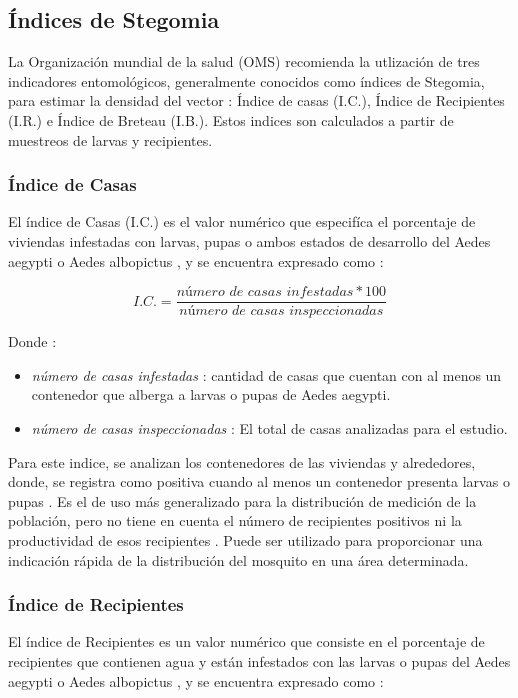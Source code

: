 
\subsection{Índices de Stegomia}
\label{sec:densidad-vectorial-indices-stegomia}
La Organización mundial de la salud (OMS) recomienda la utlización de tres indicadores
entomológicos, generalmente conocidos como índices de Stegomia, para estimar la densidad del
vector : Índice de casas (I.C.), Índice de Recipientes (I.R.) e Índice de Breteau (I.B.). Estos
indices son calculados a partir de muestreos de larvas y recipientes.

\subsubsection{Índice de Casas}
El índice de Casas (I.C.) es el valor numérico que especifíca el porcentaje de viviendas
infestadas con larvas, pupas o ambos estados de desarrollo del Aedes aegypti o Aedes albopictus
\cite{ibanez1995vectores, world2009dengue}, y se encuentra expresado como :

\begin{equation}
I.C. = \frac{\textit{número de casas infestadas} * 100}{\textit{número de casas inspeccionadas}}
\end{equation}

Donde :
\begin{itemize}
\item \textit{número de casas infestadas} : cantidad de casas que cuentan con al menos un contenedor que alberga a larvas o pupas de Aedes aegypti.
\item \textit{número de casas inspeccionadas} : El total de casas analizadas para el estudio.
\end{itemize}

Para este indice, se analizan los contenedores de las viviendas y alrededores, donde, se registra
como positiva cuando al menos un contenedor presenta larvas o pupas \cite{ibanez1995vectores}. Es
el de uso más generalizado para la distribución de medición de la población, pero no tiene en
cuenta el número de recipientes positivos ni la productividad de esos recipientes
\cite{world2009dengue}. Puede ser utilizado para proporcionar una indicación rápida de la
distribución del mosquito en una área determinada.

\subsubsection{Índice de Recipientes}
El índice de Recipientes es un valor numérico que consiste en el porcentaje de recipientes que
contienen agua y están infestados con las larvas o pupas del Aedes aegypti o Aedes albopictus
\cite{ibanez1995vectores, world2009dengue}, y se encuentra expresado como :

